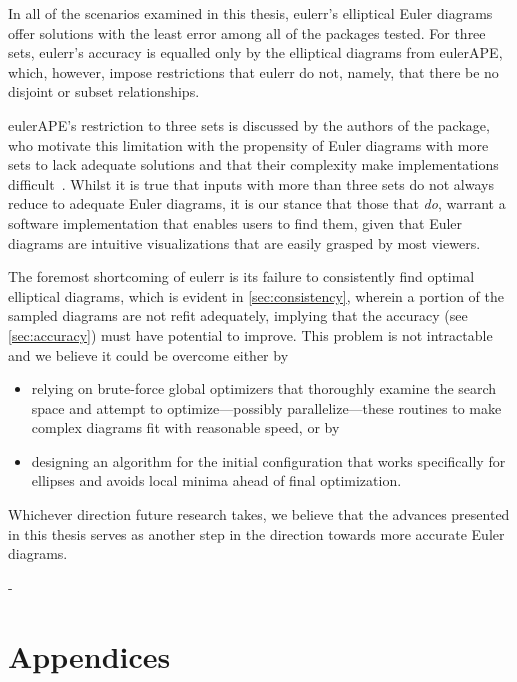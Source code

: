 \documentclass[
  oneside,
  openany,
  numbers=noendperiod,
  parskip=half,
  bibliography=totoc
]{scrbook}\usepackage[]{graphicx}\usepackage{xcolor}
\newlength{\overhang}
\newenvironment{fullwidth}{%
  \blockmargin
  \begin{addmargin*}[0em]{-\overhang}%
}{%
  \end{addmargin*}%
  \unblockmargin
}
\newcommand{\pkg}[1]{{\fontseries{b}\selectfont #1}}
\begin{document}
In all of the scenarios examined in this thesis,
\pkg{eulerr}'s elliptical Euler diagrams offer solutions with the least error
among all of the packages
tested. For three sets, \pkg{eulerr}'s accuracy is equalled only by the elliptical diagrams from
\pkg{eulerAPE}, which, however, impose restrictions that
\pkg{eulerr} do not, namely, that there be no disjoint or subset relationships.

\pkg{eulerAPE}'s restriction to three sets is discussed by the authors of the
package, who motivate this limitation with the propensity of Euler diagrams with
more sets to lack adequate solutions and that their complexity make
implementations difficult~\citep{Micallef_2013}. Whilst it is true that
inputs with more than three sets do not always reduce to adequate Euler diagrams,
it is our stance that those that \emph{do}, warrant a software implementation that
enables users to find them, given that Euler diagrams are intuitive
visualizations that are easily grasped by most viewers.

The foremost shortcoming of \pkg{eulerr} is its failure to consistently
find optimal elliptical diagrams, which is evident in \cref{sec:consistency},
wherein a portion of the sampled diagrams are not refit adequately,
implying that the accuracy (see \cref{sec:accuracy})
must have potential to improve. This problem is not intractable and we
believe it could be overcome either by
\begin{itemize}
\item relying on brute-force global optimizers that thoroughly examine
the search space and attempt to optimize---possibly parallelize---these routines
to make complex diagrams fit with reasonable speed, or by
\item designing an algorithm for the initial configuration that works
specifically for ellipses and avoids local minima ahead of final
optimization.
\end{itemize}
Whichever direction future research takes, we believe that the advances
presented in this thesis serves as another step in the direction towards more
accurate Euler diagrams.

\begin{fullwidth}
\part*{Appendices}
\end{fullwidth}
\appendix
\end{document}

